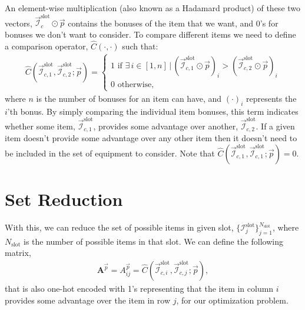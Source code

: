 	An element-wise multiplication (also known as a Hadamard product) of these two vectors, $\vec{\mathcal{I}}_c^\text{slot} \odot \vec{p}$ contains the bonuses of the item that we want, and 0's for bonuses we don't want to consider. To compare different items we need to define a comparison operator, $\hat C (\cdot, \cdot)$ such that:
	\begin{align}
	    \hat C (\vec{\mathcal{I}}_{c, 1}^\text{slot}, \vec{\mathcal{I}}_{c, 2}^\text{slot}; \vec{p}) = \begin{cases}
	        1 \text{ if $\exists\,i\in [1, n]\,|\,(\vec{\mathcal{I}}_{c, 1}^\text{slot}  \odot \vec p)_i > (\vec{\mathcal{I}}_{c, 2}^\text{slot}  \odot \vec p)_i$} \\
	        0 \text{ otherwise},
	    \end{cases}
	\end{align}
	where $n$ is the number of bonuses for an item can have, and $(\cdot)_i$ represents the $i$'th bonus.
	By simply comparing the individual item bonuses, this term indicates whether some item, $\vec{\mathcal{I}}_{c, 1}^\text{slot}$, provides some advantage over another, $\vec{\mathcal{I}}_{c, 2}^\text{slot}$. If a given item doesn't provide some advantage over any other item then it doesn't need to be included in the set of equipment to consider. Note that $\hat C (\vec{\mathcal{I}}_{c, 1}^\text{slot}, \vec{\mathcal{I}}_{c, 1}^\text{slot}; \vec{p}) = 0$.

	\section{Set Reduction}
		With this, we can reduce the set of possible items in given slot, $\{\mathcal{I}^\text{slot}_j\}_{j=1}^{N_\text{slot}}$, where $N_\text{slot}$ is the number of possible items in that slot. We can define the following matrix,
		\begin{align}
		    \boldsymbol{A}^{\vec{p}} = A_{ij}^{\vec{p}} = \hat C (\vec{\mathcal{I}}_{c, i}^\text{slot}, \vec{\mathcal{I}}_{c, j}^\text{slot}; \vec{p}),
		\end{align}
		that is also one-hot encoded with 1's representing that the item in column $i$ provides some advantage over the item in row $j$, for our optimization problem.

